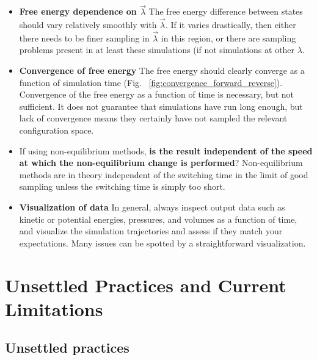 \documentclass[9pt,bestpractices]{livecoms}
\begin{document}
\begin{itemize}
\item \textbf{Free energy dependence on $\vec{\lambda}$} The free energy difference between states should vary relatively smoothly with $\vec{\lambda}$. If it varies drastically, then either there needs to be finer sampling in $\vec{\lambda}$ in this region, or there are sampling problems present in at least these simulations (if not simulations at other $\lambda$.
\item \textbf{Convergence of free energy} The free energy should clearly converge as a function of simulation time (Fig. ~\ref{fig:convergence_forward_reverse}). Convergence of the free energy as a function of time is necessary, but not sufficient.  It does not guarantee that simulations have run long enough, but lack of convergence means they certainly have not sampled the relevant configuration space.
\item If using non-equilibrium methods, \textbf{is the result independent of the speed at which the non-equilibrium change is performed}? Non-equilibrium methods are in theory independent of the switching time in the limit of good sampling unless the switching time is simply too short. 
\item \textbf{Visualization of data} In general, always inspect output data such as kinetic or potential energies, pressures, and volumes as a function of time, and visualize the simulation trajectories and assess if they match your expectations. Many issues can be spotted by a straightforward visualization. 
\end{itemize}


\section{Unsettled Practices and Current Limitations}
\label{sec:unsettled}

\subsection{Unsettled practices}
\end{document}

